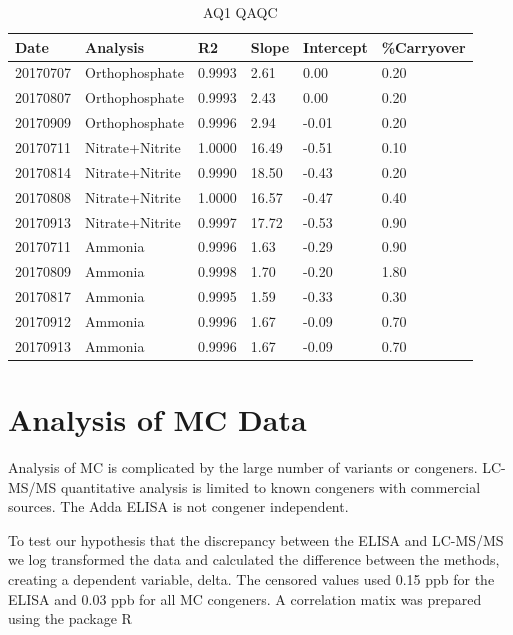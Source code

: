 \documentclass{ou-thesis}
\begin{document}
\begin{appendix}
\newpage

\begin{table}[!t]
\centering
\caption{AQ1 QAQC}
\label{AQ1 Quality Control}
\begin{tabular}{llllll}
  \hline
Date     & Analysis        & R2     & Slope & Intercept & \%Carryover \\
  \hline
20170707 & Orthophosphate     & 0.9993 & 2.61  & 0.00      & 0.20        \\
20170807 & Orthophosphate     & 0.9993 & 2.43  & 0.00      & 0.20        \\
20170909 & Orthophosphate     & 0.9996 & 2.94  & -0.01     & 0.20        \\
20170711 & Nitrate+Nitrite & 1.0000 & 16.49 & -0.51     & 0.10        \\
20170814 & Nitrate+Nitrite & 0.9990 & 18.50 & -0.43     & 0.20        \\
20170808 & Nitrate+Nitrite & 1.0000 & 16.57 & -0.47     & 0.40        \\
20170913 & Nitrate+Nitrite & 0.9997 & 17.72 & -0.53     & 0.90        \\
20170711 & Ammonia         & 0.9996 & 1.63  & -0.29     & 0.90        \\
20170809 & Ammonia         & 0.9998 & 1.70  & -0.20     & 1.80        \\
20170817 & Ammonia         & 0.9995 & 1.59  & -0.33     & 0.30        \\
20170912 & Ammonia         & 0.9996 & 1.67  & -0.09     & 0.70        \\
20170913 & Ammonia         & 0.9996 & 1.67  & -0.09     & 0.70
\end{tabular}
\end{table}

\newpage




\section*{Analysis of MC Data}

\indent Analysis of MC is complicated by the large number of variants or congeners.  LC-MS/MS quantitative analysis is limited to known congeners with commercial sources.  The Adda ELISA is not congener independent.

To test our hypothesis that the discrepancy between the ELISA and LC-MS/MS we log transformed the data and calculated the difference between the methods, creating a dependent variable, delta.  The censored values used 0.15 ppb for the ELISA and 0.03 ppb for all MC congeners.  A correlation matix was prepared using the package R


\end{appendix}
\end{document}
